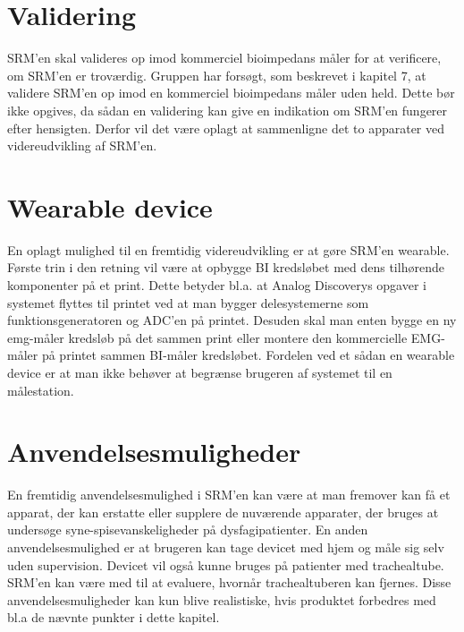  
\section{Validering}

SRM'en skal valideres op imod kommerciel bioimpedans måler for at verificere, om SRM'en er troværdig. Gruppen har forsøgt, som beskrevet i kapitel 7, at validere SRM'en op imod en kommerciel bioimpedans måler uden held. Dette bør ikke opgives, da sådan en validering kan give en indikation om SRM'en fungerer efter hensigten. Derfor vil det være oplagt at sammenligne det to apparater ved videreudvikling af SRM'en. 

\section{Wearable device}
En oplagt mulighed til en fremtidig videreudvikling er at gøre SRM'en wearable. Første trin i den retning vil være at opbygge BI kredsløbet med dens tilhørende komponenter på et print. Dette betyder bl.a. at Analog Discoverys opgaver i systemet flyttes til printet ved at man bygger delesystemerne som funktionsgeneratoren og ADC'en på printet. Desuden skal man enten bygge en ny emg-måler kredsløb på det sammen print eller montere den kommercielle EMG-måler på printet sammen BI-måler kredsløbet. Fordelen ved et sådan en wearable device er at man ikke behøver at begrænse brugeren af systemet til en målestation.   


\section{Anvendelsesmuligheder}
En fremtidig anvendelsesmulighed i SRM'en kan være at man fremover kan få et apparat, der kan erstatte eller supplere de nuværende apparater, der bruges at undersøge syne-spisevanskeligheder på dysfagipatienter. En anden anvendelsesmulighed er at brugeren kan tage devicet med hjem og måle sig selv uden supervision. Devicet vil også kunne bruges på  patienter med trachealtube. SRM'en kan være med til at evaluere, hvornår trachealtuberen kan fjernes. Disse anvendelsesmuligheder kan kun blive realistiske, hvis produktet forbedres med bl.a de nævnte punkter i dette kapitel.     